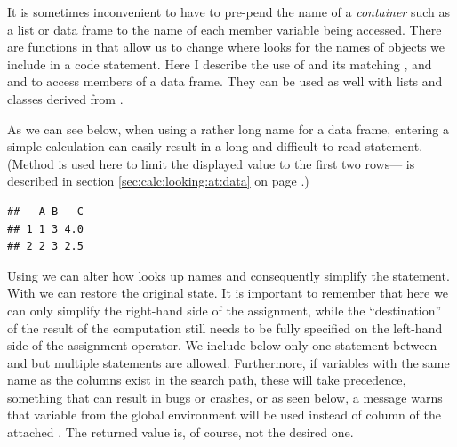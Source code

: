 \documentclass[krantz2]{krantz}\usepackage{knitr}
\begin{document}
\begin{explainbox}
It is sometimes inconvenient to have to pre-pend the name of a \emph{container} such as a list or data frame to the name of each member variable being accessed. There are functions in \Rlang that allow us to change where \Rlang looks for the names of objects we include in a code statement. Here I describe the use of  and its matching , and  and  to access members of a data frame. They can be used as well with lists and classes derived from .

As we can see below, when using a rather long name for a data frame, entering a simple calculation can easily result in a long and difficult to read statement. (Method  is used here to limit the displayed value to the first two rows--- is described in section \ref{sec:calc:looking:at:data} on page \pageref{sec:calc:looking:at:data}.)

\begin{knitrout}\footnotesize
{}\color{fgcolor}\begin{kframe}
\begin{alltt}
 \hlkwb{<-} \hlstd{(} \hlstd{=} \hlopt{:}\hlstd{,}  \hlstd{=} \hlstd{)}
\hlopt{$} \hlkwb{<-}
  \hlopt{$} \hlopt{+} \hlopt{$} \hlopt{/} \hlopt{$}
 \hlstd{)}
\end{alltt}
\begin{verbatim}
##   A B   C
## 1 1 3 4.0
## 2 2 3 2.5
\end{verbatim}
\end{kframe}
\end{knitrout}

Using  we can alter how \Rlang looks up names and consequently simplify the statement. With  we can restore the original state. It is important to remember that here we can only simplify the right-hand side of the assignment, while the ``destination'' of the result of the computation still needs to be fully specified on the left-hand side of the assignment operator. We include below only one statement between  and  but multiple statements are allowed. Furthermore, if variables with the same name as the columns exist in the search path, these will take precedence, something that can result in bugs or crashes, or as seen below, a message warns that variable  from the global environment will be used instead of column  of the attached . The returned value is, of course, not the desired one.


\end{explainbox}
\end{document}
